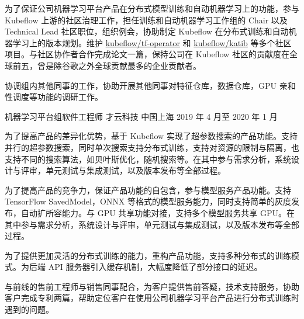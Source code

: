 \begin{cventries}
{\begin{cvitems}
        \item 为了保证公司机器学习平台产品在分布式模型训练和自动机器学习上的功能，参与 Kubeflow 上游的社区治理工作，担任训练和自动机器学习工作组的 Chair 以及 Technical Lead 社区职位，组织例会，协助制定 Kubeflow 在分布式训练和自动机器学习上的版本规划。维护 \href{https://github.com/kubeflow/tf-operator}{kubeflow/tf-operator} 和 \href{https://github.com/kubeflow/katib}{kubeflow/katib} 等多个社区项目。与社区协作者合作完成论文一篇，保持公司在 Kubeflow 社区的贡献度在全球前五，曾是除谷歌之外全球贡献最多的企业贡献者。
        \item 协调组内其他同事的工作，协助开展其他同事对特征仓库，数据仓库，GPU 亲和性调度等功能的调研工作。
      \end{cvitems}
    }

  \cventry
    {机器学习平台组软件工程师} %
    {才云科技} %
    {中国上海} %
    {2019 年 4 月至 2020 年 1 月} %
    {
      \begin{cvitems} %
        \item 为了提高产品的差异化优势，基于 Kubeflow 实现了超参数搜索的产品功能。支持并行的超参数搜索，同时单次搜索支持分布式训练，支持对资源的限制与隔离，也支持不同的搜索算法，如贝叶斯优化，随机搜索等。在其中参与需求分析，系统设计与评审，单元测试与集成测试，以及版本发布等全部过程。
        \item 为了提高产品的竞争力，保证产品功能的自包含，参与模型服务产品功能。支持 TensorFlow SavedModel，ONNX 等格式的模型服务能力，同时支持简单的灰度发布，自动扩所容能力。与 GPU 共享功能对接，支持多个模型服务共享 GPU。在其中参与需求分析，系统设计与评审，单元测试与集成测试，以及版本发布等全部过程。
        \item 为了提供更加灵活的分布式训练的能力，重构产品功能，支持多种分布式的训练模式。为后端 API 服务器引入缓存机制，大幅度降低了部分接口的延迟。
        \item 与前线的售前工程师与销售同事配合，为客户提供售前答疑，技术支持服务，协助客户完成专利两篇，帮助定位客户在使用公司机器学习平台产品进行分布式训练时遇到的问题。
      \end{cvitems}
    }


\end{cventries}
